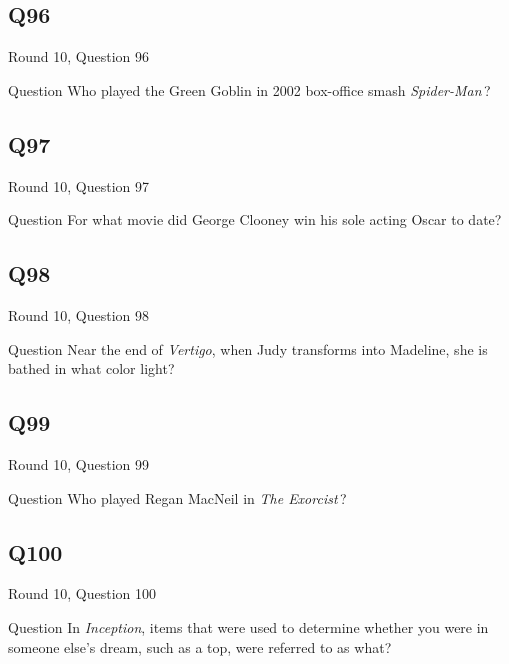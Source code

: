 \documentclass[11pt]{beamer}
\begin{document}
\subsection*{Q96}
\begin{frame}[t]{Round 10, Question 96}
\vspace{2em}
\begin{block}{Question}
Who played the Green Goblin in 2002 box-office smash \emph{Spider-Man}\,?
\end{block}
\end{frame}
    

\subsection*{Q97}
\begin{frame}[t]{Round 10, Question 97}
\vspace{2em}
\begin{block}{Question}
For what movie did George Clooney win his sole acting Oscar to date?
\end{block}
\end{frame}
    

\subsection*{Q98}
\begin{frame}[t]{Round 10, Question 98}
\vspace{2em}
\begin{block}{Question}
Near the end of \emph{Vertigo}, when Judy transforms into Madeline, she is bathed in what color light?
\end{block}
\end{frame}
    

\subsection*{Q99}
\begin{frame}[t]{Round 10, Question 99}
\vspace{2em}
\begin{block}{Question}
Who played Regan MacNeil in \emph{The Exorcist}\,?
\end{block}
\end{frame}
    

\subsection*{Q100}
\begin{frame}[t]{Round 10, Question 100}
\vspace{2em}
\begin{block}{Question}
In \emph{Inception}, items that were used to determine whether you were in someone else's dream, such as a top, were referred to as what?
\end{block}
\end{frame}
    
\end{document}
